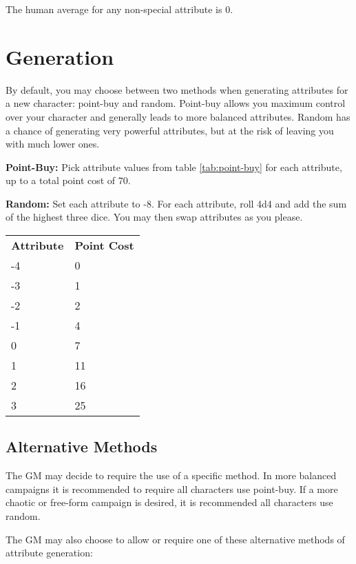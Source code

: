 \begin{multicols*}{2}
    The human average for any non-special attribute is 0.

    \section{Generation}
    By default, you may choose between two methods when generating attributes
    for a new character: point-buy and random. Point-buy allows you maximum
    control over your character and generally leads to more balanced
    attributes. Random has a chance of generating very powerful attributes, but
    at the risk of leaving you with much lower ones.
    
    \textbf{Point-Buy:} Pick attribute values from table \ref{tab:point-buy}
    for each attribute, up to a total point cost of 70.

    \textbf{Random:} Set each attribute to -8. For each attribute, roll 4d4
    and add the sum of the highest three dice. You may then swap attributes as
    you please.

    {
        \setlength\parindent{0pt}
        \unclassedrowcolors
        \begin{tabularx}{0.5\textwidth}{l X}
            \textbf{Attribute} & \textbf{Point Cost} \\
            -4 & 0 \\
            -3 & 1 \\
            -2 & 2 \\
            -1 & 4 \\
            0 & 7 \\
            1 & 11 \\
            2 & 16 \\
            3 & 25 \\
        \end{tabularx}
        \label{tab:point-buy}
    }

    \subsection{Alternative Methods}
    The GM may decide to require the use of a specific method. In more balanced
    campaigns it is recommended to require all characters use point-buy. If a
    more chaotic or free-form campaign is desired, it is recommended all
    characters use random.

    The GM may also choose to allow or require  one of these alternative
    methods of attribute generation:
    

\end{multicols*}
